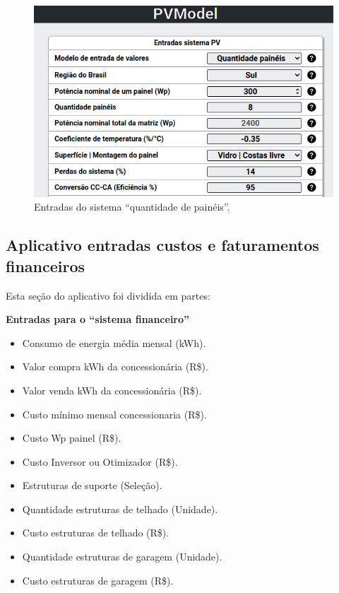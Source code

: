 \begin{figure}[H]
    \centering
    \includegraphics[width=1\textwidth]{./Figuras/modelo3.png}
    \caption{Entradas do sistema ``quantidade de painéis''.}
   \label{fig:modelo3}
\end{figure}

\newpage
\subsection{Aplicativo entradas custos e faturamentos financeiros}

Esta seção do aplicativo foi dividida em partes:

\textbf{Entradas para o ``sistema financeiro''}

\begin{itemize}
   \item Consumo de energia média mensal (kWh).
   \item Valor compra kWh da concessionária (R\$).
   \item Valor venda kWh da concessionária (R\$).
   \item Custo mínimo mensal concessionaria (R\$).
   \item Custo Wp painel (R\$).
   \item Custo Inversor ou Otimizador (R\$).
   \item Estruturas de suporte (Seleção).
   \item Quantidade estruturas de telhado (Unidade).
   \item Custo estruturas de telhado (R\$).
   \item Quantidade estruturas de garagem (Unidade).
   \item Custo estruturas de garagem (R\$).
\end{itemize}

